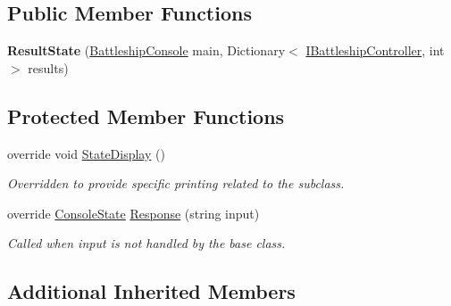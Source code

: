 \subsection*{Public Member Functions}
\begin{DoxyCompactItemize}
\item 
\hypertarget{class_m_b_c_1_1_terminal_1_1_result_state_a2026218800c999e2e3ce86279cd24035}{{\bfseries Result\-State} (\hyperlink{class_m_b_c_1_1_terminal_1_1_battleship_console}{Battleship\-Console} main, Dictionary$<$ \hyperlink{interface_m_b_c_1_1_core_1_1_i_battleship_controller}{I\-Battleship\-Controller}, int $>$ results)}\label{class_m_b_c_1_1_terminal_1_1_result_state_a2026218800c999e2e3ce86279cd24035}

\end{DoxyCompactItemize}
\subsection*{Protected Member Functions}
\begin{DoxyCompactItemize}
\item 
\hypertarget{class_m_b_c_1_1_terminal_1_1_result_state_aa3b4aff3c8ecbc6ef612dd9b3bcf1fff}{override void \hyperlink{class_m_b_c_1_1_terminal_1_1_result_state_aa3b4aff3c8ecbc6ef612dd9b3bcf1fff}{State\-Display} ()}\label{class_m_b_c_1_1_terminal_1_1_result_state_aa3b4aff3c8ecbc6ef612dd9b3bcf1fff}

\begin{DoxyCompactList}\small\item\em Overridden to provide specific printing related to the subclass.\end{DoxyCompactList}\item 
override \hyperlink{class_m_b_c_1_1_terminal_1_1_console_state}{Console\-State} \hyperlink{class_m_b_c_1_1_terminal_1_1_result_state_a530fa6f7b36a58d0ffa09fab3048508a}{Response} (string input)
\begin{DoxyCompactList}\small\item\em Called when input is not handled by the base class.\end{DoxyCompactList}\end{DoxyCompactItemize}
\subsection*{Additional Inherited Members}


